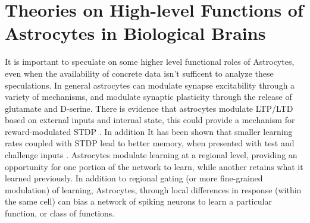     
    
    \section{Theories on High-level Functions of Astrocytes in Biological Brains}
    
    It is important to speculate on some higher level functional roles of
    Astrocytes, even when the availability of concrete data isn't sufficent to
    analyze these speculations. In general astrocytes can modulate synapse
    excitability through a variety of mechanisms, and modulate synaptic
    plasticity through the release of glutamate and D-serine. There is evidence
    that astrocytes modulate LTP/LTD based on external inputs and internal
    state, this could provide a mechanism for reward-modulated STDP
    \cite{min_2012}. In addition It has been shown that smaller learning rates
    coupled with STDP lead to better memory, when presented with test and
    challenge inputs \cite{van-rossum_2012}. Astrocytes modulate learning at a
    regional level, providing an opportunity for one portion of the network to
    learn, while another retains what it learned previously. In addition to
    regional gating (or more fine-grained modulation) of learning, Astrocytes,
    through local differences in response (within the same cell) can bias a
    network of spiking neurons to learn a particular function, or class of
    functions.

